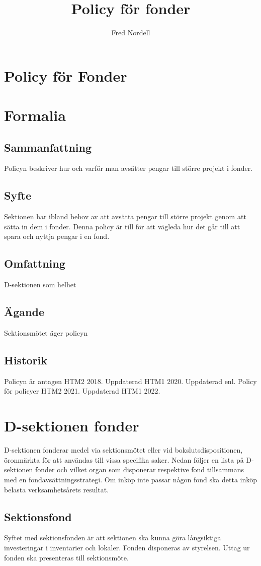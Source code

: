 \documentclass{dsekprotokoll}
\title{Policy för fonder}
\author{Fred Nordell}
\begin{document}
\section*{Policy för Fonder}
\section{Formalia}
\subsection{Sammanfattning}
Policyn beskriver hur och varför man avsätter pengar till större projekt i fonder.
\subsection{Syfte}
Sektionen har ibland behov av att avsätta pengar till större projekt genom att sätta in dem i fonder.
Denna policy är till för att vägleda hur det går till att spara och nyttja pengar i en fond.
\subsection{Omfattning}
D-sektionen som helhet
\subsection{Ägande}
Sektionsmötet äger policyn
\subsection{Historik}
Policyn är antagen HTM2 2018.
Uppdaterad HTM1 2020.
Uppdaterad enl. Policy för policyer HTM2 2021.
Uppdaterad HTM1 2022.

\section{D-sektionen fonder}
D-sektionen fonderar medel via sektionsmötet eller vid bokslutsdispositionen, öronmärkta för
att användas till vissa specifika saker. Nedan följer en lista på D-sektionen fonder och vilket organ som disponerar respektive fond tillsammans med en fondavsättningsstrategi. Om inköp inte passar
någon fond ska detta inköp belasta verksamhetsårets resultat.

\subsection{Sektionsfond}
Syftet med sektionsfonden är att sektionen ska kunna göra långsiktiga investeringar i inventarier och lokaler. Fonden disponeras av styrelsen. Uttag ur fonden ska presenteras
till sektionsmöte.
\end{document}
